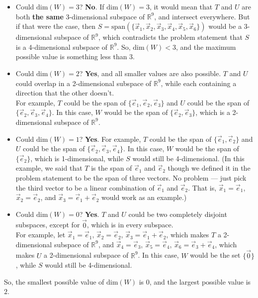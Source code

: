 \documentclass[11pt]{article}
\begin{document}
\begin{prob}[(14 pts)]
\begin{subprob}
\begin{solution}
\begin{itemize}
    \item Could $\text{dim}(W) = 3$? \textbf{No}. If $\text{dim}(W) = 3$, it would mean that $T$ and $U$ are both \textbf{the same} 3-dimensional subspace of $\mathbb{R}^9$, and intersect everywhere. But if that were the case, then $S = \text{span}(\{ \vec x_1, \vec x_2, \vec x_3, \vec x_4, \vec x_5, \vec x_6 \})$ would be a 3-dimensional subspace of $\mathbb{R}^9$, which contradicts the problem statement that $S$ is a 4-dimensional subspace of $\mathbb{R}^9$. So, $\text{dim}(W) < 3$, and the maximum possible value is something less than 3.
    \item Could $\text{dim}(W) = 2$? \textbf{Yes}, and all smaller values are also possible. $T$ and $U$ could overlap in a 2-dimensional subspace of $\mathbb{R}^9$, while each containing a direction that the other doesn't. \\ 
    For example, $T$ could be the span of $\{\vec e_1, \vec e_2, \vec e_3\}$ and $U$ could be the span of $\{\vec e_2, \vec e_3, \vec e_4\}$. In this case, $W$ would be the span of $\{\vec e_2, \vec e_3\}$, which is a 2-dimensional subspace of $\mathbb{R}^9$.
    \item Could $\text{dim}(W) = 1$? \textbf{Yes}. For example, $T$ could be the span of $\{\vec e_1, \vec e_2\}$ and $U$ could be the span of $\{\vec e_2, \vec e_3, \vec e_4 \}$. In this case, $W$ would be the span of $\{\vec e_2\}$, which is 1-dimensional, while $S$ would still be 4-dimensional. (In this example, we said that $T$ is the span of $\vec e_1$ and $\vec e_2$ though we defined it in the problem statement to be the span of three vectors. No problem --- just pick the third vector to be a linear combination of $\vec e_1$ and $\vec e_2$. That is, $\vec x_1 = \vec e_1$, $\vec x_2 = \vec e_2$, and $\vec x_3 = \vec e_1 + \vec e_2$ would work as an example.)
    \item Could $\text{dim}(W) = 0$? \textbf{Yes}. $T$ and $U$ could be two completely disjoint subspaces, except for $\vec 0$, which is in every subspace. \\
    For example, let $\vec x_1 = \vec e_1$, $\vec x_2 = \vec e_2$, $\vec x_3 = \vec e_1 + \vec e_2$, which makes $T$ a 2-dimensional subspace of $\mathbb{R}^9$, and $\vec x_4 = \vec e_3$, $\vec x_5 = \vec e_4$, $\vec x_6 = \vec e_3 + \vec e_4$, which makes $U$ a 2-dimensional subspace of $\mathbb{R}^9$. In this case, $W$ would be the set $\{\vec 0\}$, while $S$ would still be 4-dimensional.
    \end{itemize}

So, the smallest possible value of $\text{dim}(W)$ is $\boxed{0}$, and the largest possible value is $\boxed{2}$.
\end{solution}

\end{subprob}

\end{prob}
\end{document}
